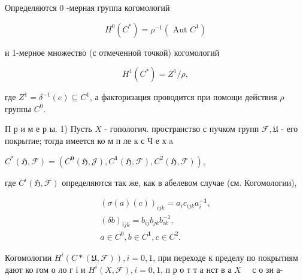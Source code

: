 \documentclass[10pt]{article}
\begin{document}
Определяются 0 -мерная группа когомологий



\[

H^{0}\left(C^{*}\right)=\rho^{-1}\left(\text { Aut } C^{1}\right)

\]



и 1-мерное множество (с отмеченной точкой) когомологий



\[

H^{1}\left(C^{*}\right)=Z^{1} / \rho,

\]



где $Z^{1}=\delta^{-1}(e) \subseteq C^{1}$, а факторизация проводится при помощи действия $\rho$ группы $C^{0}$.



П р и м е р ы. 1) Пусть $X$ - гопологич. пространство с пучком групп $\mathscr{F}, \mathfrak{U}$ - его покрытие; тогда имеется ко м п ле к с Ч е х a



$C^{*}(\mathfrak{H}, \mathscr{F})=\left(C^{\mathbf{0}}(\mathfrak{H}, \mathscr{J}), C^{\mathbf{1}}(\mathfrak{H}, \mathscr{F}), C^{2}(\mathfrak{H}, \mathscr{F})\right)$,



где $C^{i}(\mathfrak{H}, \mathscr{F})$ определяются так же, как в абелевом случае (см. Когомологии),



\[

\begin{gathered}

(\sigma(a)(c))_{i j k}=a_{i} c_{i j k} a_{i}^{-\mathbf{1}}, \\

(\delta b)_{i j k}=b_{i j} b_{j k} b_{i k}^{-1}, \\

a \in C^{0}, b \in C^{\mathbf{1}}, c \in C^{2} .

\end{gathered}

\]



Когомологии $H^{i}(C *(\mathfrak{U}, \mathscr{F})), i=0,1$, при переходе к пределу по покрытиям дают ко гом о ло г і и $H^{i}(X, \mathcal{F}), i=0,1$, п р о т т а нст в а $X \quad$ с о зи а-
\end{document}

